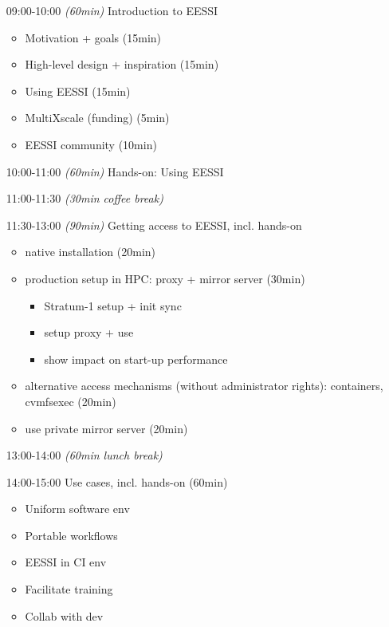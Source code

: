\begin{itemize}[style=standard, labelwidth=1.9cm]
    \item [09:00-10:00] \emph{(60min)} Introduction to EESSI
    \begin{itemize}
        \item Motivation + goals (15min)
        \item High-level design + inspiration (15min)
        \item Using EESSI (15min)
        \item MultiXscale (funding) (5min)
        \item EESSI community (10min)
    \end{itemize}
    \item [10:00-11:00] \emph{(60min)} Hands-on: Using EESSI
    \item [11:00-11:30] \emph{(30min coffee break)}
    \item [11:30-13:00] \emph{(90min)} Getting access to EESSI, incl. hands-on
    \begin{itemize}
        \item native installation (20min)
        \item production setup in HPC: proxy + mirror server (30min)
        \begin{itemize}
            \item Stratum-1 setup + init sync
            \item setup proxy + use
            \item show impact on start-up performance
        \end{itemize}
        \item alternative access mechanisms (without administrator rights): containers, cvmfsexec (20min)
        \item use private mirror server (20min)
    \end{itemize}
    \item [13:00-14:00] \emph{(60min lunch break)}
    \item [14:00-15:00] Use cases, incl. hands-on (60min)
    \begin{itemize}
        \item Uniform software env
        \item Portable workflows
        \item EESSI in CI env
        \item Facilitate training
        \item Collab with dev
    \end{itemize}

\end{itemize}
